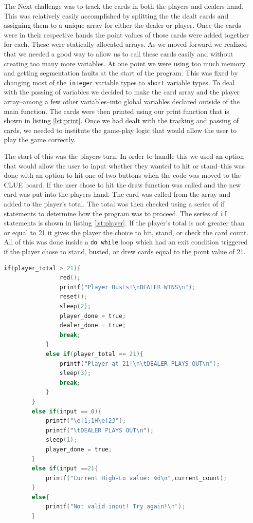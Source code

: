 \documentclass[12pt]{article}
\begin{document}
The Next challenge was to track the cards in both the players and dealers hand. This was relatively easily accomplished by splitting the the dealt cards and assigning them to a unique array for either the dealer or player. Once the cards were in their respective hands the point values of those cards were added together for each. These were statically allocated arrays. As we moved forward we realized that we needed a good way to allow us to call these cards easily and without creating too many more variables. At one point we were using too much memory and getting segmentation faults at the start of the program. This was fixed by changing most of the \texttt{integer} variable types to \texttt{short} variable types. To deal with the passing of variables we decided to make the card array and the player array--among a few other variables--into global variables declared outside of the main function. The cards were then printed using our print function that is shown in listing \ref{lst:print}. Once we had dealt with the tracking and passing of cards, we needed to institute the game-play logic that would allow the user to play the game correctly.

The start of this was the players turn. In order to handle this we used an option that would allow the user to input whether they wanted to hit or stand--this was done with an option to hit one of two buttons when the code was moved to the CLUE board. If the user chose to hit the draw function was called and the new card was put into the players hand. The card was called from the array and added to the player's total. The total was then checked using a series of if statements to determine how the program was to proceed. The series of \texttt{if} statements is shown in listing \ref{lst:player}. If the player's total is not greater than or equal to 21 it gives the player the choice to hit, stand, or check the card count. All of this was done inside a \texttt{do while} loop which had an exit condition triggered if the player chose to stand, busted, or drew cards equal to the point value of 21.

\begin{lstlisting}[language = C, caption = Player Choice Logic, label = {lst:player}]
if(player_total > 21){
                red();
                printf("Player Busts!\nDEALER WINS\n");
                reset();
                sleep(2);
                player_done = true;
                dealer_done = true;
                break;
            }
            else if(player_total == 21){
                printf("Player at 21!\n\tDEALER PLAYS OUT\n");
                sleep(3);
                break;
            }
        }
        else if(input == 0){
            printf("\e[1;1H\e[2J");
            printf("\tDEALER PLAYS OUT\n");
            sleep(1);
            player_done = true;
        } 
        else if(input ==2){
            printf("Current High-Lo value: %d\n",current_count);
        }
        else{
            printf("Not valid input! Try again!\n");
        }
\end{lstlisting}
\end{document}
